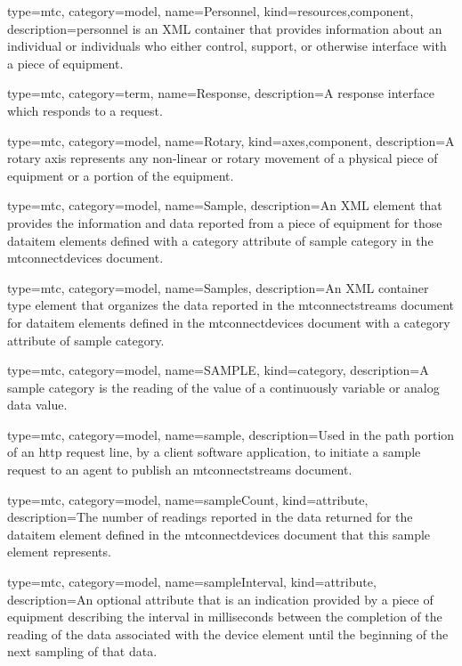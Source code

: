 {
  type=mtc,
  category=model,
  name={Personnel},
  kind={resources,component},
  description={\gls{personnel} is an XML container that provides information about an individual or individuals who either control, support, or otherwise interface with a piece of equipment.
}
}


{
  type=mtc,
  category=term,
  name={Response},
  description={A response \gls{interface} which responds to a \gls{request}.}
}


{
  type=mtc,
  category=model,
  name={Rotary},
  kind={axes,component},
  description={A \gls{rotary} axis represents any non-linear or rotary movement of a physical piece of equipment or a portion of the equipment. }
}


{
  type=mtc,
  category=model,
  name={Sample},
  description={An XML element that provides the information and data reported from a piece of equipment for those \gls{dataitem} elements defined with a \gls{category} attribute of \gls{sample category} in the \gls{mtconnectdevices} document. }
}


{
  type=mtc,
  category=model,
  name={Samples},
  description={An XML container type element that organizes the data reported in the \gls{mtconnectstreams} document for \gls{dataitem} elements defined in the \gls{mtconnectdevices} document with a \gls{category} attribute of \gls{sample category}.}
}


{
  type=mtc,
  category=model,
  name={SAMPLE},
  kind={category},
  description={A \gls{sample category} is the reading of the value of a continuously variable or analog data value.}
}


{
  type=mtc,
  category=model,
  name={sample},
  description={Used in the path portion of an \gls{http request line}, by a client software application, to initiate a \gls{sample request} to an \gls{agent} to publish an \gls{mtconnectstreams} document.}
}


{
  type=mtc,
  category=model,
  name={sampleCount},
  kind={attribute},
  description={The number of readings reported in the data returned for the \gls{dataitem} element defined in the \gls{mtconnectdevices} document that this \gls{sample} element represents.}
}


{
  type=mtc,
  category=model,
  name={sampleInterval},
  kind={attribute},
  description={An optional attribute that is an indication provided by a piece of equipment describing the interval in milliseconds between the completion of the reading of the data associated with the \gls{device} element until the beginning of the next sampling of that data.}
}


